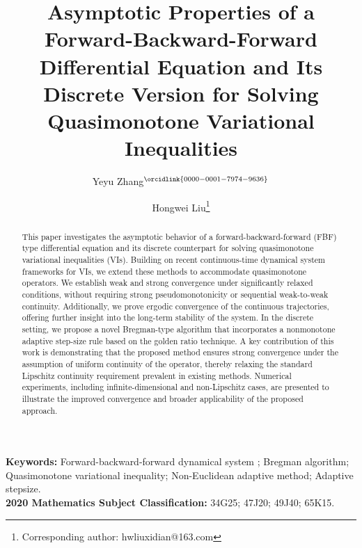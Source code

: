\documentclass[hidelinks,11 pt]{article}
\numberwithin{equation}{section}
\theoremstyle{definition}  %
\numberwithin{equation}{section}
\numberwithin{theorem}{section}
\begin{document}
{\LARGE{\title{{\bf Asymptotic Properties of a Forward-Backward-Forward Differential Equation and Its Discrete Version for Solving Quasimonotone Variational Inequalities}}}}

\author[1]{Yeyu Zhang$^{\orcidlink{0000-0001-7974-9636}}$}
\author[1]{Hongwei Liu\thanks{Corresponding author: hwliuxidian@163.com}}


\date{}
\maketitle

\begin{abstract}
This paper investigates the asymptotic behavior of a forward-backward-forward (FBF) type differential equation and its discrete counterpart for solving quasimonotone variational inequalities (VIs). Building on recent continuous-time dynamical system frameworks for VIs, we extend these methods to accommodate quasimonotone operators. We establish weak and strong convergence under significantly relaxed conditions, without requiring strong pseudomonotonicity or sequential weak-to-weak continuity. Additionally, we prove ergodic convergence of the continuous trajectories, offering further insight into the long-term stability of the system. In the discrete setting, we propose a novel Bregman-type algorithm that incorporates a nonmonotone adaptive step-size rule based on the golden ratio technique. A key contribution of this work is demonstrating that the proposed method ensures strong convergence under the assumption of uniform continuity of the operator, thereby relaxing the standard Lipschitz continuity requirement prevalent in existing methods. Numerical experiments, including infinite-dimensional and non-Lipschitz cases, are presented to illustrate the improved convergence and broader applicability of the proposed approach.


\end{abstract}

\vspace{2mm}
\noindent
\textbf{Keywords:} Forward-backward-forward dynamical system
; Bregman algorithm; Quasimonotone variational inequality; Non-Euclidean adaptive method; Adaptive stepsize.\\[1mm]
\noindent
\textbf{2020 Mathematics Subject Classification:} 34G25; 47J20; 49J40; 65K15.
\end{document}

